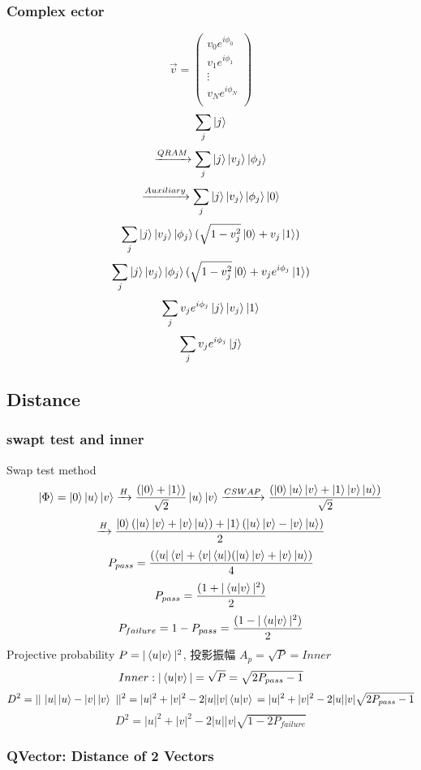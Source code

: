 \documentclass{article}
\begin{document}
\subsubsection{ Complex ector}
$$ \vec{v} =\left(
\begin{array}{c}
v_0 e^{i\phi_0} \\
v_1 e^{i\phi_1} \\
\vdots \\
v_N e^{i\phi_N} \\
\end{array}
\right) $$
$$ \sum_j{ \ket{j} } $$
$$ \xrightarrow{QRAM}  \sum_j{\ket{j}\ket{v_j} \ket{\phi_j} } $$
$$ \xrightarrow{Auxiliary}  \sum_j{\ket{j}\ket{v_j} \ket{\phi_j} \ket{0} } $$
$$  \sum_j{\ket{j}\ket{v_j} \ket{\phi_j} ( \sqrt{1-v_j^2} \ket{0} + v_j\ket{1}) } $$
$$  \sum_j{\ket{j}\ket{v_j} \ket{\phi_j} ( \sqrt{1-v_j^2} \ket{0} + v_j e^{i\phi_j}\ket{1}) } $$
$$  \sum_j{v_j e^{i\phi_j} \ket{j}\ket{v_j}\ket{1} } $$
$$  \sum_j{v_j e^{i\phi_j} \ket{j} } $$

\subsection{Distance}
\subsubsection{swapt test and inner}
Swap test method
$$ \ket{\Phi} = \ket{0} \ket{u} \ket{v} \xrightarrow{H}  \frac{(\ket{0}+\ket{1})}{\sqrt{2} }\ket{u}\ket{v}  \xrightarrow{CSWAP}  \frac{(\ket{0}\ket{u}\ket{v}+\ket{1}	\ket{v}\ket{u})}{\sqrt{2}} \\ $$
$$\xrightarrow{H}  \frac{\ket{0}(\ket{u}\ket{v}+\ket{v}\ket{u})+\ket{1}(\ket{u}\ket{v}-\ket{v}\ket{u})}{2} $$
$$ P_{pass}=\frac{(\bra{u}\bra{v}+\bra{v}\bra{u}) (\ket{u}\ket{v}+\ket{v}\ket{u})}{4}$$
$$ P_{pass}=\frac{(1+|\braket{u|v}|^2)}{2}$$
$$ P_{failure}=1-P_{pass} = \frac{(1-|\braket{u|v}|^2)}{2}$$
 Projective probability $ P = |\braket{u|v}|^2 $, 投影振幅 $A_p = \sqrt{P} = Inner $
$$ Inner: |\braket{u|v}| = \sqrt{P} =\sqrt{ 2P_{pass} -1} $$
$$ D^{2}=||\ |u|\ket{u}-|v|\ket{v}\ ||^{2} = |u|^2+|v|^2-2|u||v| \braket{u|v}\\
 =|u|^2+|v|^2-2|u||v|\sqrt{2P_{pass} - 1} $$
$$ D^2=|u|^2+|v|^2-2|u||v|\sqrt{1-2P_{failure}} $$

\subsubsection{ QVector: Distance of 2 Vectors}
\end{document}
